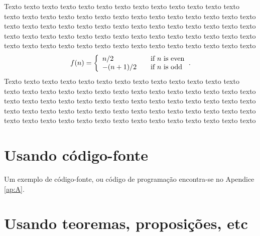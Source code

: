 Texto texto texto texto texto texto texto texto texto texto texto texto texto texto texto texto texto texto texto texto texto texto texto texto texto texto texto texto texto texto texto texto texto texto texto texto texto texto texto texto texto texto texto texto texto texto texto texto texto texto texto texto texto texto texto texto texto texto texto texto texto texto texto texto texto texto texto texto texto
	\begin{equation}
	\label{eq:sistema}
		\begin{aligned}
			f(n) = \left\{ 
			\begin{array}{l l}
			n/2 & \quad \text{if $n$ is even}\\
			-(n+1)/2 & \quad \text{if $n$ is odd}
			\end{array} \right.
		\end{aligned}.
	\end{equation}
Texto texto texto texto texto texto texto texto texto texto texto texto texto texto texto texto texto texto texto texto texto texto texto texto texto texto texto texto texto texto texto texto texto texto texto texto texto texto texto texto texto texto texto texto texto texto texto texto texto texto texto texto texto texto texto texto texto texto texto texto texto texto texto texto texto texto texto texto texto



\section{Usando código-fonte}

Um exemplo de código-fonte, ou código de programação encontra-se no Apendice \ref{ap:A}.

 
\section{Usando teoremas, proposições, etc}

